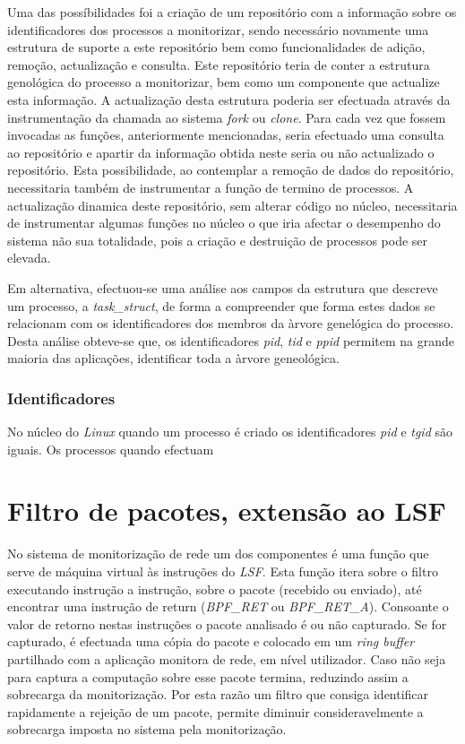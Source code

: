 Uma das possíbilidades foi a criação de um repositório com a informação sobre os identificadores dos processos a monitorizar, sendo necessário novamente uma estrutura de suporte a este repositório bem como funcionalidades de adição, remoção, actualização e consulta.
Este repositório teria de conter a estrutura genológica do processo a monitorizar, bem como um componente que actualize esta informação.
A actualização desta estrutura poderia ser efectuada através da instrumentação da chamada ao sistema \textit{fork} ou \textit{clone}.
Para cada vez que fossem invocadas as funções, anteriormente mencionadas, seria efectuado uma consulta ao repositório e apartir da informação obtida neste seria ou não actualizado o repositório.
Esta possibilidade, ao contemplar a remoção de dados do repositório, necessitaria também de instrumentar a função de termino de processos.
A actualização dinamica deste repositório, sem alterar código no núcleo, necessitaria de instrumentar algumas funções no núcleo o que iria afectar o desempenho do sistema não sua totalidade, pois a criação e destruição de processos pode ser elevada.

Em alternativa, efectuou-se uma análise aos campos da estrutura que descreve um processo, a \textit{task\_struct}, de forma a compreender que forma estes dados se relacionam com os identificadores dos membros da àrvore genelógica do processo.
Desta análise obteve-se que, os identificadores \textit{pid}, \textit{tid} e \textit{ppid} permitem na grande maioria das aplicações, identificar toda a àrvore geneológica.


\subsubsection{Identificadores}

No núcleo do \textit{Linux} quando um processo é criado os identificadores \textit{pid} e \textit{tgid} são iguais.
Os processos quando efectuam



\section{Filtro de pacotes, extensão ao LSF}

No sistema de monitorização de rede um dos componentes é uma função que serve de máquina virtual às instruções do \textit{LSF}.
Esta função itera sobre o filtro executando instrução a instrução, sobre o pacote (recebido ou enviado), até encontrar uma instrução de return (\textit{BPF\_RET} ou \textit{BPF\_RET\_A}).
Consoante o valor de retorno nestas instruções o pacote analisado é ou não capturado.
Se for capturado, é efectuada uma cópia do pacote e colocado em um \textit{ring buffer} partilhado com a aplicação monitora de rede, em nível utilizador.
Caso não seja para captura a computação sobre esse pacote termina, reduzindo assim a sobrecarga da monitorização.
Por esta razão um filtro que consiga identificar rapidamente a rejeição de um pacote, permite diminuir consideravelmente a sobrecarga imposta no sistema pela monitorização.

